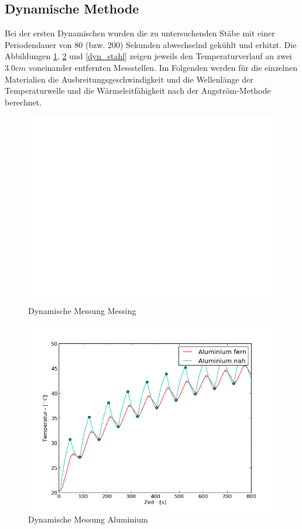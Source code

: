 \documentclass[11pt]{article}
\begin{document}
\subsection{Dynamische Methode}
Bei der ersten Dynamischen wurden die zu untersuchenden St\"abe mit einer Periodendauer von 80 (bzw. 200)  Sekunden abwechselnd gek\"uhlt und erhitzt. Die Abbildungen \ref{dyn_messing}, \ref{dyn_alu} und \ref{dyn_stahl} zeigen jeweils den Temperaturverlauf an zwei 3.0$cm$ voneinander entfernten Messstellen. Im Folgenden werden f\"ur die einzelnen Materialien die Ausbreitungsgeschwindigkeit und die Wellenl\"ange der Temperaturwelle und die W\"armeleitf\"ahigkeit nach der Angstr\"om-Methode berechnet.

\begin{figure}[htp]
\centering
\includegraphics[width=\textwidth]{Diagramme/dyn_messing.png}
\caption{Dynamische Messung Messing}
\label{dyn_messing}
\end{figure}
\begin{figure}[htp]
\centering
\includegraphics[width=\textwidth]{Diagramme/dyn_alu.png}
\caption{Dynamische Messung Aluminium}
\label{dyn_alu}
\end{figure}
\end{document}
